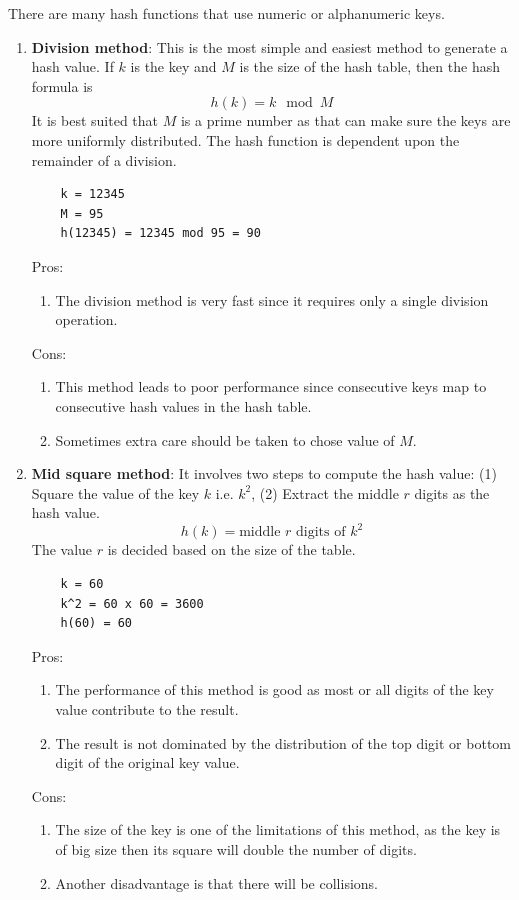 \documentclass[a4paper,11pt]{book}
\begin{document}
\noindent There are many hash functions that use numeric or alphanumeric keys.
\begin{enumerate}
    \item \textbf{Division method}: This is the most simple and easiest method to generate a hash value. If $k$ is the key and $M$ is the size of the hash table, then the hash formula is
    $$h(k) = k\mod M$$
    \noindent It is best suited that $M$ is a prime number as that can make sure the keys are more uniformly distributed. The hash function is dependent upon the remainder of a division.
    \begin{lstlisting}
    k = 12345
    M = 95
    h(12345) = 12345 mod 95 = 90
    \end{lstlisting}
    Pros:
    \begin{enumerate}
        \item The division method is very fast since it requires only a single division operation.
    \end{enumerate}
    Cons:
    \begin{enumerate}
        \item This method leads to poor performance since consecutive keys map to consecutive hash values in the hash table.
        \item Sometimes extra care should be taken to chose value of $M$.
    \end{enumerate}
    
    \item \textbf{Mid square method}: It involves two steps to compute the hash value: (1) Square the value of the key $k$ i.e. $k^2$, (2) Extract the middle $r$ digits as the hash value.
    $$h(k) = \text{middle } r \text{ digits of } k^2$$
    \noindent The value $r$ is decided based on the size of the table.
    \begin{lstlisting}
    k = 60
    k^2 = 60 x 60 = 3600
    h(60) = 60
    \end{lstlisting}
    Pros:
    \begin{enumerate}
        \item The performance of this method is good as most or all digits of the key value contribute to the result.
        \item The result is not dominated by the distribution of the top digit or bottom digit of the original key value.
    \end{enumerate}
    Cons:
    \begin{enumerate}
        \item The size of the key is one of the limitations of this method, as the key is of big size then its square will double the number of digits.
        \item Another disadvantage is that there will be collisions.
    \end{enumerate}
    

\end{enumerate}
\end{document}

